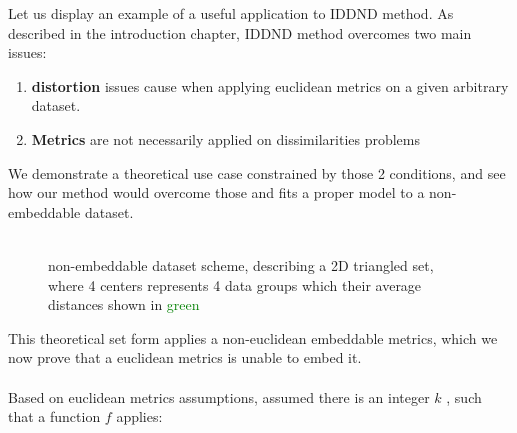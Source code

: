 Let us display an example of a useful application to IDDND method.
As described in the introduction chapter{}, IDDND method overcomes two main issues:

\begin{enumerate}
	\item \textbf{distortion} issues cause when applying euclidean metrics on a given arbitrary dataset. 
	\item \textbf{Metrics} are not necessarily applied on dissimilarities problems
\end{enumerate}

We demonstrate a theoretical use case constrained by those 2 conditions, and see how our method would overcome those and fits a proper model to a non-embeddable dataset.
\\ \\ 
\newcommand{\centert}{2.66}

\begin{figure}[h]
	\centering

	
	\caption[triangle non-embeddable dataset]
	{non-embeddable dataset scheme, describing a 2D triangled set, where 4 centers represents 4 data groups which their average distances shown in \textcolor{green}{green}}
	
	\end{figure}
	
	This theoretical set form applies a non-euclidean embeddable metrics, which we now prove that a euclidean metrics is unable to embed it. \\ \\
	Based on euclidean metrics assumptions, assumed there is an integer $k$ , such that a function $f$ applies: \\
	
